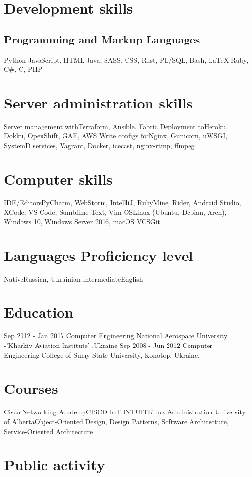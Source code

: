 \documentclass[11pt,a4paper]{moderncv}
\begin{document}
	\section{Development skills}
	\subsection{Programming and Markup Languages}
	{Python}
    {JavaScript, HTML}
    {Java, SASS, CSS, Rust, PL/SQL, Bash, LaTeX}
	{Ruby, C\#, C, PHP}

	\section{Server administration skills}
	\cvline
	{Server management with}{Terraform, Ansible, Fabric}
	\cvline
	{Deployment to}{Heroku, Dokku, OpenShift, GAE, AWS}
	\cvline
	{Write configs for}{Nginx, Gunicorn, uWSGI, SystemD services, Vagrant, Docker, icecast, nginx-rtmp, ffmpeg}
	
	\section{Computer skills}
	\cvline
	{IDE/Editors}{PyCharm, WebStorm, IntellliJ, RubyMine, Rider, Android Studio, XCode, VS Code, Sumblime Text, Vim}
	\cvline
	{OS}{Linux (Ubuntu, Debian, Arch), Windows 10, Windows Server 2016, macOS}
	\cvline
	{VCS}{Git}

	\section{Languages Proficiency level}
	\cvline
	{Native}{Russian, Ukrainian}
	\cvline
	{Intermediate}{English}
	
	\section{Education}
	\cventry
	{Sep 2012 - Jan 2017}
	{Computer Engineering}
	{National Aerospace University -'Kharkiv Aviation Institute' ,Ukraine}
	{}{}{}
	{Sep 2008 - Jun 2012}
	{Computer Engineering}
	{College of Sumy State University, Konotop, Ukraine.}
	{}{}{}
	\cventry
	
	\section{Courses}
	\cvline
	{Cisco Networking Academy}{CISCO IoT}
	\cvline
	{INTUIT}{\href{https://www.intuit.ru/verifydiplomas/00187814}{Linux Administration}}
	\cvline
	{University of Alberta}{\href{https://coursera.org/share/5eb676b588d0e8d5bbc77f3a6707afb7}{Object-Oriented Design}, Design Patterns, Software Architecture, Service-Oriented Architecture}
	
	\section{Public activity}
\end{document}
